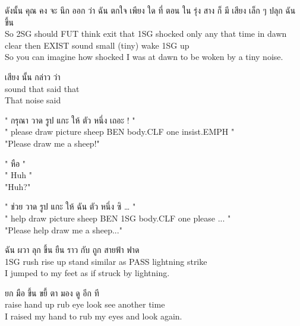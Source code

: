 \documentclass{book}
\begin{document}
	\begin{exe}
		\ex 
		\gll ดังนั้น คุณ คง จะ นึก ออก ว่า ฉัน ตกใจ เพียง ใด ที่ ตอน ใน รุ่ง สาง ก็ มี เสียง เล็ก ๆ ปลุก ฉัน ขึ้น\\
		So \textsc{2SG} should \textsc{FUT} think exit that \textsc{1SG} shocked only any that time in dawn clear then \textsc{EXIST} sound small (tiny) wake \textsc{1SG} up\\
		So you can imagine how shocked I was at dawn to be woken by a tiny noise.
	\end{exe}

	\begin{exe}
		\ex 
		\gll เสียง นั้น กล่าว ว่า\\
		sound that said that\\
		That noise said
	\end{exe}

	\begin{exe}
		\ex 
		\gll " กรุณา วาด รูป แกะ ให้ ตัว หนึ่ง เถอะ ! "\\
		" please draw picture sheep \textsc{BEN} body.\textsc{CLF} one insist.\textsc{EMPH} "\\
		"Please draw me a sheep!"
	\end{exe}

	\begin{exe}
		\ex 
		\gll " หือ " \\
		" Huh "\\
		"Huh?"
	\end{exe}

	\begin{exe}
		\ex 
		\gll " ช่วย วาด รูป แกะ ให้ ฉัน ตัว หนึ่ง ซิ … "\\
		" help draw picture sheep \textsc{BEN} \textsc{1SG} body.\textsc{CLF} one please ... "\\
		"Please help draw me a sheep..."
	\end{exe}

	\begin{exe}
		\ex 
		\gll ฉัน ผวา ลุก ขึ้น ยืน ราว กับ ถูก สายฟ้า ฟาด\\
		\textsc{1SG} rush rise up stand similar as \textsc{PASS} lightning strike \\
		I jumped to my feet as if struck by lightning.
	\end{exe}

	\begin{exe}
		\ex 
		\gll ยก มือ ขึ้น ขยี้ ตา มอง ดู อีก ที\\
		raise hand up rub eye look see another time\\
		I raised my hand to rub my eyes and look again.
	\end{exe}
\end{document}
